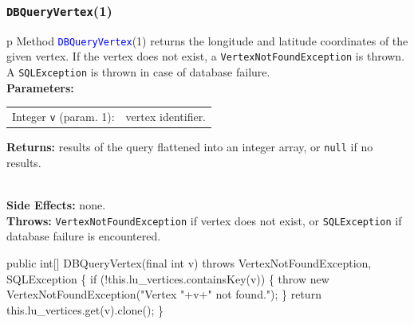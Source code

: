 \documentclass{article}
\def\nwendcode{\endtrivlist \endgroup}      %
\let\nwdocspar=\par
\theoremstyle{definition}                   %
\begin{document}
\subsubsection{{\tt{}\protect{}DBQueryVertex}(1)}
\begin{tabular}{p{\textwidth}}
\toprule
{}
Method \textcolor{blue}{{\tt{}\protect{}DBQueryVertex}}(1) returns the longitude and
latitude coordinates of the given vertex. If the vertex does not exist,
a {\tt{}VertexNotFoundException} is thrown.
A {\tt{}SQLException} is thrown in case of database failure.\\
\midrule
\textbf{Parameters:} \\
\begin{tabular}{lp{116mm}}
Integer {\tt{}v} (param. 1):&vertex identifier.
\end{tabular}
\textbf{Returns:} results of the query flattened into an integer array, or
{\tt{}null} if no results.

\\
\textbf{Side Effects:} none.\\
\textbf{Throws:} {\tt{}VertexNotFoundException} if vertex does not exist, or
{\tt{}SQLException} if database failure is encountered.\\
\bottomrule
\end{tabular}
\nwenddocs{}\endmoddef{}
public int[] DBQueryVertex(final int v)
throws VertexNotFoundException, SQLException \{
  if (!this.lu_vertices.containsKey(v)) \{
    throw new VertexNotFoundException("Vertex "+v+" not found.");
  \}
  return this.lu_vertices.get(v).clone();
\}
\eatline
{}\nwendcode{}\nwdocspar
\end{document}
